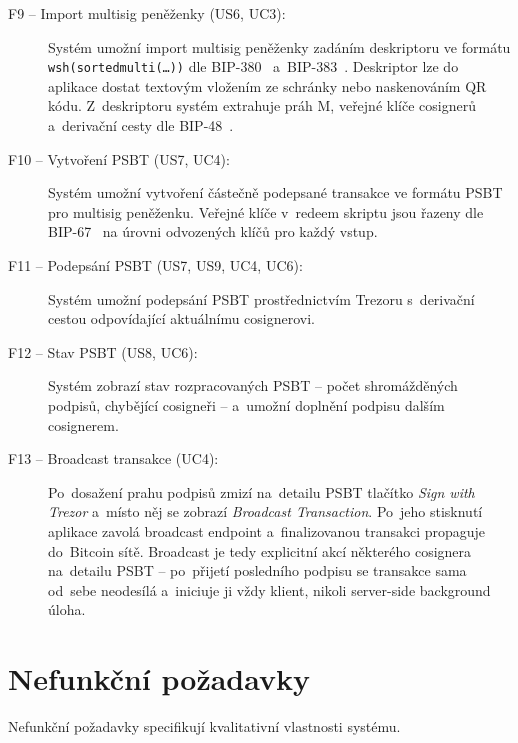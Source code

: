 \begin{description}
  \item[F9 -- Import multisig peněženky \textnormal{(US6, UC3)}:]
    Systém umožní import multisig peněženky zadáním deskriptoru ve formátu
    \texttt{wsh(sortedmulti(\ldots))} dle BIP-380~\cite{BIP380}
    a~BIP-383~\cite{BIP383}. Deskriptor lze do aplikace dostat textovým
    vložením ze schránky nebo naskenováním QR kódu. Z~deskriptoru systém
    extrahuje práh M, veřejné klíče cosignerů a~derivační cesty dle
    BIP-48~\cite{BIP48}.

  \item[F10 -- Vytvoření PSBT \textnormal{(US7, UC4)}:]
    Systém umožní vytvoření částečně podepsané transakce ve formátu
    PSBT~\cite{BIP174} pro multisig peněženku. Veřejné klíče v~redeem
    skriptu jsou řazeny dle BIP-67~\cite{BIP67} na úrovni odvozených
    klíčů pro každý vstup.

  \item[F11 -- Podepsání PSBT \textnormal{(US7, US9, UC4, UC6)}:]
    Systém umožní podepsání PSBT prostřednictvím Trezoru s~derivační
    cestou odpovídající aktuálnímu cosignerovi.

  \item[F12 -- Stav PSBT \textnormal{(US8, UC6)}:]
    Systém zobrazí stav rozpracovaných PSBT -- počet shromážděných
    podpisů, chybějící cosigneři -- a~umožní doplnění podpisu dalším
    cosignerem.

  \item[F13 -- Broadcast transakce \textnormal{(UC4)}:]
    Po~dosažení prahu podpisů zmizí na~detailu PSBT tlačítko
    \emph{Sign with Trezor} a~místo něj se zobrazí \emph{Broadcast
    Transaction}. Po~jeho stisknutí aplikace zavolá broadcast
    endpoint a~finalizovanou transakci propaguje do~Bitcoin sítě.
    Broadcast je tedy explicitní akcí některého cosignera
    na~detailu PSBT -- po~přijetí posledního podpisu se transakce
    sama od~sebe neodesílá a~iniciuje ji vždy klient, nikoli
    server-side background úloha.
\end{description}

\section{Nefunkční požadavky}
\label{sec:nefunkcni-pozadavky}

Nefunkční požadavky specifikují kvalitativní vlastnosti systému.

